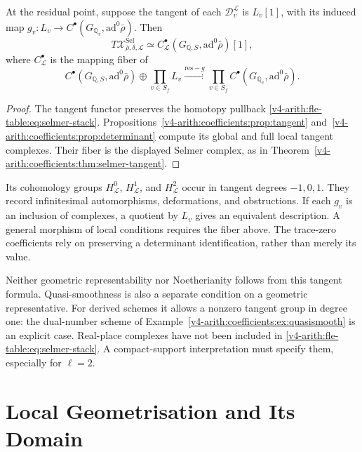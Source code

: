 \begin{proposition}
\label{v4-arith:fle-table:prop:selmer-tangent}
At the residual point, suppose the tangent of each
\(\mathcal D_v^{\mathcal L}\) is \(L_v[1]\), with its induced map
\(g_v:L_v\to C^\bullet(G_{\mathbb Q_v},\mathrm{ad}^0\bar\rho)\).
Then
\begin{equation}
\label{v4-arith:fle-table:eq:selmer-tangent}
T\mathcal X^{\mathrm{Sel}}_{\bar\rho,\delta,\mathcal L}
\simeq C^\bullet_{\mathcal L}
       (G_{\mathbb Q,S},\mathrm{ad}^0\bar\rho)[1],
\end{equation}
where \(C^\bullet_{\mathcal L}\) is the mapping fiber of
\[
 C^\bullet(G_{\mathbb Q,S},\mathrm{ad}^0\bar\rho)
 \oplus\prod_{v\in S_f}L_v
 \xrightarrow{\mathrm{res}-g}
 \prod_{v\in S_f}C^\bullet(G_{\mathbb Q_v},\mathrm{ad}^0\bar\rho).
\]
\end{proposition}
\begin{proof}
The tangent functor preserves the homotopy pullback
\eqref{v4-arith:fle-table:eq:selmer-stack}.
Propositions~\ref{v4-arith:coefficients:prop:tangent}
and~\ref{v4-arith:coefficients:prop:determinant} compute its global
and full local tangent complexes. Their fiber is the displayed
Selmer complex, as in
Theorem~\ref{v4-arith:coefficients:thm:selmer-tangent}.
\end{proof}

Its cohomology groups \(H^0_{\mathcal L}\),
\(H^1_{\mathcal L}\), and \(H^2_{\mathcal L}\) occur in tangent
degrees \(-1,0,1\). They record infinitesimal automorphisms,
deformations, and obstructions. If each \(g_v\) is an inclusion of
complexes, a quotient by \(L_v\) gives an equivalent description.
A general morphism of local conditions requires the fiber above.
The trace-zero coefficients rely on preserving a determinant
identification, rather than merely its value.

Neither geometric representability nor Noetherianity follows from
this tangent formula. Quasi-smoothness is also a separate condition
on a geometric representative. For derived schemes it allows a
nonzero tangent group in degree one: the dual-number scheme of
Example~\ref{v4-arith:coefficients:ex:quasismooth} is an explicit
case. Real-place complexes have not been included in
\eqref{v4-arith:fle-table:eq:selmer-stack}. A compact-support
interpretation must specify them, especially for \(\ell=2\).

\section{Local Geometrisation and Its Domain}
\label{v4-arith:fle-table:local-geometrisation}

